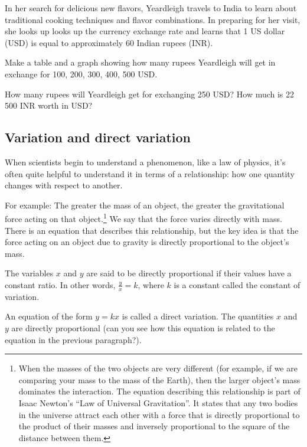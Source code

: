 \begin{boxexplore}
In her search for delicious new flavors, Yeardleigh travels to India to learn about traditional cooking techniques and flavor combinations. In preparing for her visit, she looks up looks up the currency exchange rate and learns that 1 US dollar (USD) is equal to approximately 60 Indian rupees (INR).

Make a table and a graph showing how many rupees Yeardleigh will get in exchange for 100, 200, 300, 400, 500 USD.

How many rupees will Yeardleigh get for exchanging 250 USD? How much is 22\,500 INR worth in USD?
\end{boxexplore} %


\subsection{Variation and direct variation}

When scientists begin to understand a phenomenon, like a law of physics, it's often quite helpful to understand it in terms of a relationship: how one quantity changes with respect to another.

For example: The greater the mass of an object, the greater the gravitational force acting on that object.\footnote{When the masses of the two objects are very different (for example, if we are comparing your mass to the mass of the Earth), then the larger object's mass dominates the interaction. The equation describing this relationship is part of Isaac Newton's ``Law of Universal Gravitation''. It states that any two bodies in the universe attract each other with a force that is directly proportional to the product of their masses and inversely proportional to the square of the distance between them.} We say that the force varies directly with mass. There is an equation that describes this relationship, but the key idea is that the force acting on an object due to gravity is directly proportional to the object's mass.

\begin{boxdef}
The variables $x$ and $y$ are said to be \gls{directly proportional} if their values have a constant ratio. In other words, $\frac{y}{x} = k$, where $k$ is a constant called the \gls{constant of variation}.

An equation of the form $y = kx$ is called a \gls{direct variation}. The quantities $x$ and $y$ are directly proportional (can you see how this equation is related to the equation in the previous paragraph?).
\end{boxdef}

